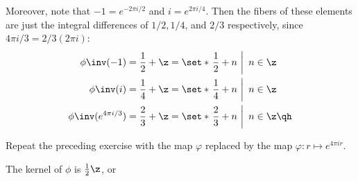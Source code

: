 \begin{problems}
\begin{sol}
\begin{center}
        \end{center}
        Moreover, note that $-1 = e^{-2\pi i/2}$ and $i = e^{2\pi i/4}$. Then the fibers of these elements are just the integral differences of $1/2, 1/4$, and $2/3$ respectively, since $4\pi i/3 = 2/3(2\pi i)$:
        \begin{align*}
            \phi\inv(-1) & = \frac 12 + \z = \set*{\left.\frac 12 + n~\right|~n \in \z} \\
            \phi\inv(i) & = \frac 14 + \z = \set*{\left.\frac 14 + n~\right|~n \in \z} \\
            \phi\inv(e^{4\pi i/3}) & = \frac 23 + \z = \set*{\left.\frac 23 + n~\right|~n \in \z} \qh
        \end{align*}
    \end{sol}
    \item Repeat the preceding exercise with the map $\varphi$ replaced by the map $\varphi : r \mapsto e^{4\pi i r}$.
    \begin{sol}
        The kernel of $\phi$ is $\frac12\z$, or
        \begin{center}
\end{center}
\end{sol}
\end{problems}
